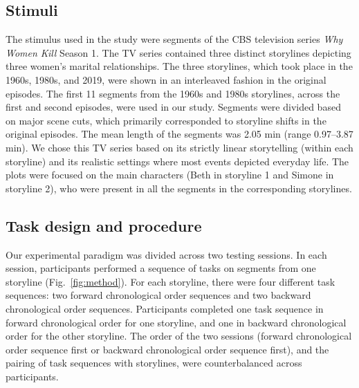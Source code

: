 \documentclass[10pt]{article}
\begin{document}
\subsection*{Stimuli}
The stimulus used in the study were segments of the CBS television series \textit{Why Women Kill} Season 1. The TV series contained three distinct storylines depicting three women’s marital relationships. The three storylines, which took place in the 1960s, 1980s, and 2019, were shown in an interleaved fashion in the original episodes. The first 11 segments from the 1960s and 1980s storylines, across the first and second episodes, were used in our study. Segments were divided based on major scene cuts, which primarily corresponded to storyline shifts in the original episodes. The mean length of the segments was 2.05 min (range 0.97--3.87 min). We chose this TV series based on its strictly linear storytelling (within each storyline) and its realistic settings where most events depicted everyday life. The plots were focused on the main characters (Beth in storyline 1 and Simone in storyline 2), who were present in all the segments in the corresponding storylines.

\subsection*{Task design and procedure}
Our experimental paradigm was divided across two testing sessions. In each session, participants performed a sequence of tasks on segments from one storyline (Fig.~\ref{fig:method}).  For each storyline, there were four different task sequences: two forward chronological order sequences and two backward chronological order sequences. Participants completed one task sequence in forward chronological order for one storyline, and one in backward chronological order for the other storyline. The order of the two sessions (forward chronological order sequence first or backward chronological order sequence first), and the pairing of task sequences with storylines, were counterbalanced across participants.
\end{document}
